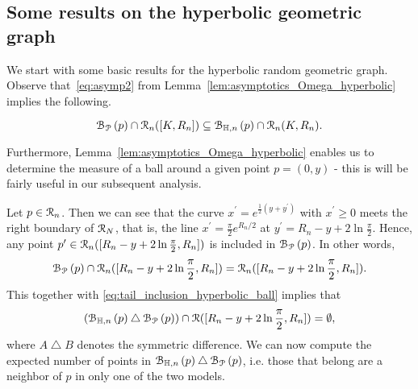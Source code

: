 
\subsection{Some results on the hyperbolic geometric graph}

We start with some basic results for the hyperbolic random geometric graph. Observe that~\eqref{eq:asymp2} from Lemma~\ref{lem:asymptotics_Omega_hyperbolic} implies the following. 
\begin{corollary}\label{cor:balls_inclusion}
\begin{equation*}
 {\mathcal B}_{{\mathcal P}}\left(p\right) \cap {\mathcal R}_n ([K,R_n]) \subseteq {\mathcal B}_{\mathbb{H},n}\left(p\right) \cap {\mathcal R}_n (K,R_n). 
\end{equation*}
\end{corollary}


Furthermore, Lemma~\ref{lem:asymptotics_Omega_hyperbolic} enables us to determine the measure of a ball around a given point $p=(0,y)$ - this is will be fairly useful in our subsequent analysis. 

Let $p \in {\mathcal R}_n$. Then we can see that the curve $x^\prime = e^{\frac{1}{2} (y + y^\prime)}$ with $x^\prime \geq 0$ meets the right boundary of ${\mathcal R}_N$, that is, the line $x^\prime = \frac{\pi}{2} e^{R_n/2}$ at $y^\prime = R_n - y + 2\ln \frac{\pi}{2}$. Hence, any point $p^{\prime} \in {\mathcal R}_n ([R_n - y + 2\ln \frac{\pi}{2}, R_n])$ is included in ${\mathcal B}_{{\mathcal P}}\left(p\right)$. In other words,
\begin{equation*} \label{eq:P_ball_inclusion_lower}
{\mathcal B}_{{\mathcal P}}\left(p\right) \cap {\mathcal R}_n ([R_n - y +2\ln \frac{\pi}{2},R_n]) = {\mathcal R}_n ([R_n - y + 2\ln \frac{\pi}{2},R_n]).
\end{equation*}
This together with \eqref{eq:tail_inclusion_hyperbolic_ball} implies that 
\begin{equation}\label{eq:symm_diff_upper_P} 
({\mathcal B}_{\mathbb{H},n}\left(p\right) \bigtriangleup {\mathcal B}_{{\mathcal P}}\left(p\right))  \cap {\mathcal R} ([R_n - y + 2 \ln \frac{\pi}{2},R_n]) = \emptyset,
\end{equation}
where $A \bigtriangleup B$ denotes the symmetric difference. We can now compute the expected number of points in ${\mathcal B}_{\mathbb{H},n}\left(p\right) \bigtriangleup {\mathcal B}_{{\mathcal P}}\left(p\right)$, i.e. those that belong are a neighbor of $p$ in only one of the two models.

